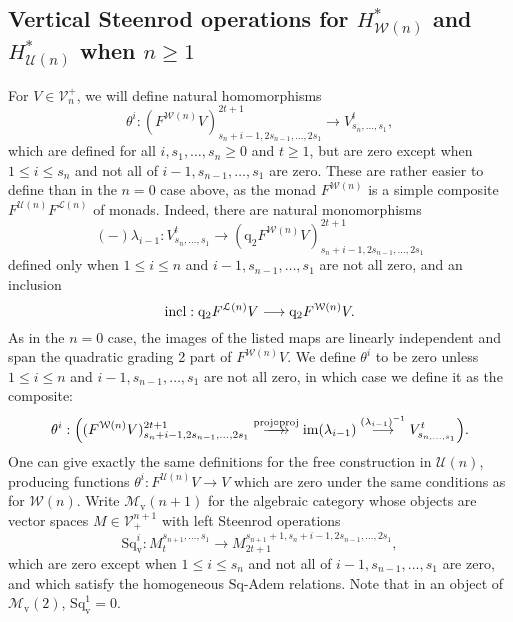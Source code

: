 \documentclass[11pt]{amsart} \renewcommand{\baselinestretch}{1.4}
\theoremstyle{plain}
\theoremstyle{definition}
\DeclareMathOperator{\im}{im}
\newcommand{\DASH}{\mathrm{-}}
\renewcommand{\to}{\longrightarrow}
\newcommand{\calU}{\mathcal{U}}
\newcommand{\calL}{\mathcal{L}}
\newcommand{\calV}{\mathcal{V}}
\newcommand{\calw}{\mathcal{W}}
\newcommand{\calu}{\mathcal{U}}
\newcommand{\call}{\mathcal{L}}
\newcommand{\calMv}{\mathcal{M}\dver}
\newcommand{\vect}[2]{\calV^{#1}_{#2}}
\newcommand{\quadgrad}[1]{\mathrm{q}_{#1}}
\newcommand{\Sq}{\mathrm{Sq}}
\newcommand{\dver}{_\mathrm{v}}
\newcommand{\Sqv}{\mathrm{Sq}\dver}
\begin{document}
\begin{Cohomology Operations for W and U}
\subsection{Vertical Steenrod operations for $H^*_{\calw(n)}$ and $H^*_{\calU(n)}$ when $n\geq1$}
\label{section: vertical Koszul operations n positive}
For $V\in \vect{+}{n}$, we will define natural homomorphisms
\[\theta^i:(F^{\calw(n)}V)^{2t+1}_{s_n+i-1,2s_{n-1},\ldots,2s_1}\to V^{t}_{s_n,\ldots,s_1},\]
which are defined for all $i,s_1,\ldots,s_n\geq0$ and $t\geq1$, but are zero except when $1\leq i \leq s_n$ and not all of $i-1,s_{n-1},\ldots,s_1$ are zero.
These are rather easier to define than in the $n=0$ case above, as the monad $F^{\calw(n)}$ is a simple composite $F^{\calu(n)}F^{\call(n)}$ of monads.
Indeed, there are natural monomorphisms
\[(\DASH)\lambda_{i-1}:V^{t}_{s_n,\ldots,s_1}\to (\quadgrad{2}F^{\calw(n)}V)^{2t+1}_{s_n+i-1,2s_{n-1},\ldots,2s_1}\]
defined only when   $1\leq i\leq n$ and $i-1,s_{n-1},\ldots,s_1$ are not all zero, and an inclusion
\[\textup{incl}:\quadgrad{2}F^{\calL(n)}V\to \quadgrad{2}F^{\calw(n)}V.\]
As in the $n=0$ case, the images of the listed maps are linearly independent and span the quadratic grading 2 part of $F^{\calw(n)}V$. We define $\theta^i$ to be zero unless $1\leq i\leq n$ and $i-1,s_{n-1},\ldots,s_1$ are not all zero, in which case we define it as the composite: %
\[\theta^i:\Bigl((F^{\calw(n)}V)^{2t+1}_{s_n+i-1,2s_{n-1},\ldots,2s_1}\overset{\textup{proj}\circ\textup{proj}}{\makebox[.06ex][l]{$\to$}\to} \im (\lambda_{i-1})\overset{(\lambda_{i-1})^{-1}}{\to}V^{t}_{s_{n,\ldots,s_1}}\Bigr).\]
One can give exactly the same definitions for the free construction in $\calU(n)$, producing functions $\theta^i:F^{\calU(n)}V\to V$ which are zero under the same conditions as for $\calw(n)$.
Write $\calMv(n+1)$ for the algebraic category whose objects are vector spaces $M\in\vect{n+1}{+}$ with left Steenrod operations
\[\Sqv^i:M^{s_{n+1},\ldots,s_1}_t\to M^{s_{n+1}+1,s_n+i-1,2s_{n-1},\ldots,2s_1}_{2t+1},\]
which are zero except when $1\leq i \leq s_n$ and not all of $i-1,s_{n-1},\ldots,s_1$ are zero, and which
satisfy the homogeneous $\Sq$-Adem relations. Note that in an object of $\calMv(2)$, $\Sqv^1=0$.


\end{Cohomology Operations for W and U}
\end{document}
